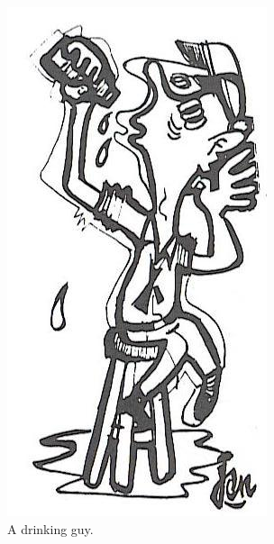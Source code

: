\documentclass[a5paper]{article}
\begin{document}
\begin{figure}[ht!]
\centering
\includegraphics[width = 0.65\linewidth]{drinker.png}
\caption{A drinking guy.}
\end{figure}
\end{document}

